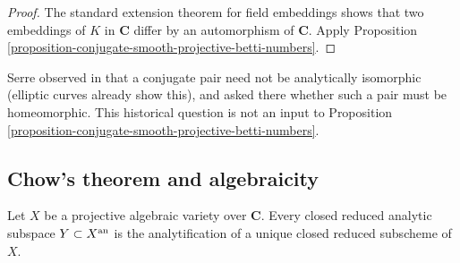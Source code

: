 \begin{proof}
The standard extension theorem for field embeddings shows that two
embeddings of $K$ in $\mathbf C$ differ by an automorphism of $\mathbf C$.
Apply Proposition
\ref{proposition-conjugate-smooth-projective-betti-numbers}.
\end{proof}

\begin{remark}
\label{remark-conjugate-varieties-historical}
Serre observed in \cite[\S 4, no. 18]{GAGA} that a conjugate pair need not be
analytically isomorphic (elliptic curves already show this), and asked there
whether such a pair must be homeomorphic. This historical question is not an
input to Proposition
\ref{proposition-conjugate-smooth-projective-betti-numbers}.
\end{remark}


\subsection{Chow's theorem and algebraicity}
\label{subsection-gaga-chow}

\begin{theorem}[Chow]
\label{theorem-chow-closed-analytic-projective}
\begin{reference}
\cite[\S 4, no. 19, Proposition 13]{GAGA}
\end{reference}
Let $X$ be a projective algebraic variety over $\mathbf C$. Every closed reduced
analytic subspace $Y\subset X^{\rm an}$ is the analytification of a unique
closed reduced subscheme of $X$.
\end{theorem}

